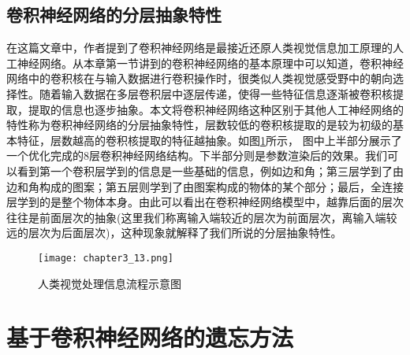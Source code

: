 \subsection{卷积神经网络的分层抽象特性}
在这篇文章\cite{2019arXiv190906161K}中，作者提到了卷积神经网络是最接近还原人类视觉信息加工原理的人工神经网络。从本章第一节讲到的卷积神经网络的基本原理中可以知道，卷积神经网络中的卷积核在与输入数据进行卷积操作时，很类似人类视觉感受野中的朝向选择性。随着输入数据在多层卷积层中逐层传递，使得一些特征信息逐渐被卷积核提取，提取的信息也逐步抽象。本文将卷积神经网络这种区别于其他人工神经网络的特性称为卷积神经网络的分层抽象特性，层数较低的卷积核提取的是较为初级的基本特征，层数越高的卷积核提取的特征越抽象。如图\ref{fig:chapter3_13}所示， 图中上半部分展示了一个优化完成的8层卷积神经网络结构。下半部分则是参数渲染后的效果。我们可以看到第一个卷积层学到的信息是一些基础的信息，例如边和角；第三层学到了由边和角构成的图案；第五层则学到了由图案构成的物体的某个部分；最后，全连接层学到的是整个物体本身。由此可以看出在卷积神经网络模型中，越靠后面的层次往往是前面层次的抽象(这里我们称离输入端较近的层次为前面层次，离输入端较远的层次为后面层次)，这种现象就解释了我们所说的分层抽象特性。
\begin{figure}
    \centering
    \texttt{[image: chapter3\_13.png]}
    \caption{人类视觉处理信息流程示意图\cite{luyujie2018}}
    \label{fig:chapter3_13}
\end{figure}

\section{基于卷积神经网络的遗忘方法}

